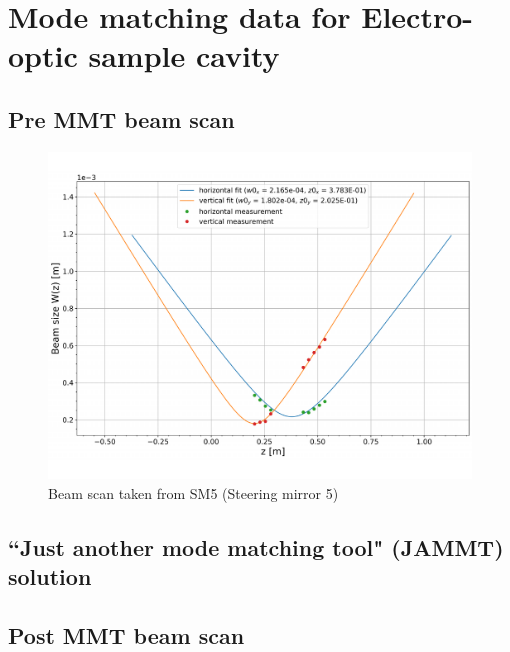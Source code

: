 \section{Mode matching data for Electro-optic sample cavity}

\subsection{Pre MMT beam scan}

\begin{figure}[H]
\includegraphics[width=.95\textwidth]{figs/ALGAAS/beam_scans/12_18_2020_preMMT.pdf}
\caption{Beam scan taken from SM5 (Steering mirror 5)}
\label{fig:beamscan2020}
\end{figure}

\subsection{``Just another mode matching tool" (JAMMT) solution}
\subsection{Post MMT beam scan}

